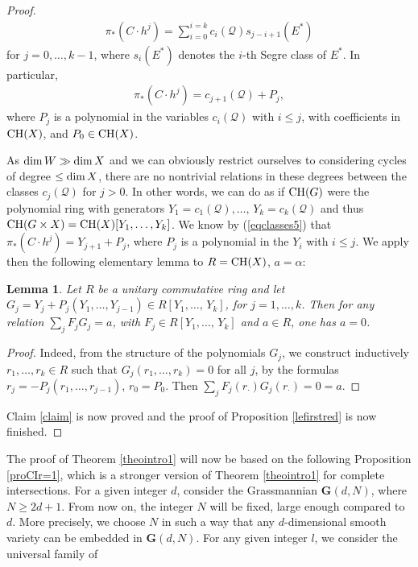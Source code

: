 \documentclass[10pt]{article}
\newtheorem{lemm}[theo]{Lemma}
\begin{document}
\begin{proof}
\begin{eqnarray}\label{eqclasses} \pi_*(C\cdot h^j)=\sum_{i=0}^{i=k} c_i(\mathcal{Q})s_{j-i+1}(E^*)
\end{eqnarray}
for $j=0,\ldots,k-1$, where $s_i(E^*)$ denotes the $i$-th Segre class of $E^*$.
In particular,
\begin{eqnarray}\label{eqclasses5}\pi_*(C\cdot h^j)=c_{j+1}(\mathcal{Q})+P_j,\end{eqnarray} where $P_j$ is a polynomial
in the variables  $c_i(\mathcal{Q})$ with $i\leq j$, with coefficients in ${\rm CH}(X)$, and $P_0\in{\rm CH}(X)$.

 As ${\rm dim}\,W\gg {\rm dim}\,X$ and we can obviously restrict ourselves to  considering cycles of degree
$\leq {\rm dim}\,X$, there are no nontrivial relations in these degrees between the classes
$c_j(\mathcal{Q})$ for $j>0$. In other words, we can do as if ${\rm CH}(G)$ were the
 polynomial ring with generators
$Y_1=c_1(\mathcal{Q}),\ldots,\,Y_k=c_k(\mathcal{Q})$ and thus ${\rm CH}(G\times X)={\rm CH}(X)[Y_1,\ldots, Y_k]$. We know by (\ref{eqclasses5}) that
$\pi_*(C\cdot h^j)=Y_{j+1}+P_j$, where $P_j$ is a polynomial
in the $Y_{i}$ with $i\leq j$.
We apply  then the following elementary lemma to $R={\rm CH}(X)$, $a=\alpha$:
\begin{lemm} Let $R$ be a unitary commutative ring and
let $G_j=Y_j+P_j(Y_1,\ldots,Y_{j-1})\in R[Y_1,\ldots,\,Y_k]$, for $j=1,\ldots, k$. Then
for any relation $\sum_jF_j G_j=a$, with
$F_j\in R[Y_1,\ldots,\,Y_k]$ and  $a\in R$, one has $a=0$.
\end{lemm}
\begin{proof} Indeed, from the structure of the polynomials
$G_j$, we  construct inductively  $r_1,\ldots,r_k\in R$ such that
$G_j(r_1,\ldots, r_k)=0$ for all $j$, by the formulas $r_j=-P_j(r_1,\ldots,r_{j-1})$, $r_0=P_0$. Then $\sum_jF_j(r_\cdot)G_j(r_\cdot)=0=a$.
\end{proof}
Claim \ref{claim} is now proved and the proof of Proposition \ref{lefirstred} is now finished.
\end{proof}
The proof of Theorem \ref{theointro1}  will now be based on the following Proposition
\ref{proCIr=1}, which is
a stronger version of Theorem \ref{theointro1} for complete intersections.  For a given integer $d$, consider the Grassmannian
$\mathbf{G}(d,N)$, where $N\geq 2d+1$. From now on, the integer $N$ will be fixed, large enough compared to $d$. More precisely, we choose $N$ in such a way that any
$d$-dimensional smooth variety can be embedded in $\mathbf{G}(d,N)$.
For any given integer $l$, we consider the universal family of
\end{document}
